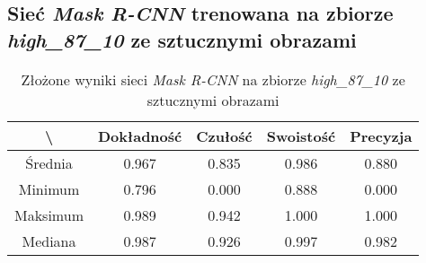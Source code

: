 \subsection{Sieć \textit{Mask R-CNN} trenowana na zbiorze \textit{high\_87\_10} ze sztucznymi obrazami}

\begin{table}[H]
	\centering
	\caption{Złożone wyniki sieci \textit{Mask R-CNN} na zbiorze \textit{high\_87\_10} ze sztucznymi obrazami}
	\vspace{6pt}
	{\footnotesize
		\begin{tabular}{|c|c|c|c|c|}
      \hline \textbackslash & Dokładność & Czułość & Swoistość & Precyzja \\
      \hline Średnia & 0.967 & 0.835 & 0.986 & 0.880 \\
      \hline Minimum & 0.796 & 0.000 & 0.888 & 0.000 \\
      \hline Maksimum & 0.989 & 0.942 & 1.000 & 1.000 \\
      \hline Mediana & 0.987 & 0.926 & 0.997 & 0.982 \\
      \hline
		\end{tabular}
	}
  \vspace{0pt}
  \label{Tab:high_original_generated_calculated}
\end{table}

